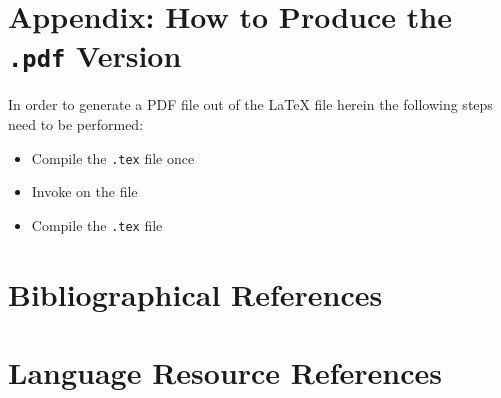 \documentclass{lrec}
\begin{document}
\vspace{.3\baselineskip}

\section*{Appendix: How to Produce the \texttt{.pdf} Version}

In order to generate a PDF file out of the LaTeX file herein the following steps need to be performed:

\begin{itemize}
    \item Compile the \texttt{.tex} file once
    \item Invoke  on the   file
    \item Compile the \texttt{.tex} file 
\end{itemize}

\section{Bibliographical References}
\label{main:ref}
\printbibliography[nottype=languageresource]

\section{Language Resource References}
\label{lr:ref}
\printbibliography[type=languageresource]
\end{document}
